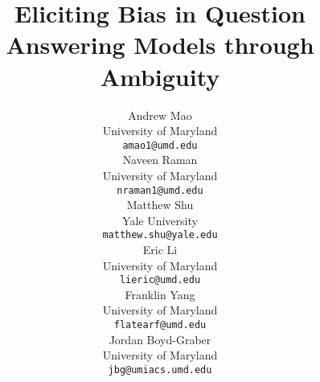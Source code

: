 \documentclass[11pt]{article}
\title{Eliciting Bias in Question Answering Models through Ambiguity}
\author{Andrew Mao \\
	University of Maryland \\
	\texttt{amao1@umd.edu} \\\And
	Naveen Raman \\
	University of Maryland \\
	\texttt{nraman1@umd.edu} \\\And
	Matthew Shu \\
	Yale University \\
	\texttt{matthew.shu@yale.edu} \\\AND
	Eric Li \\
	University of Maryland \\
	\texttt{lieric@umd.edu} \\\And
	Franklin Yang\\
	University of Maryland \\
	\texttt{flatearf@umd.edu} \\\And
	Jordan Boyd-Graber \\
	University of Maryland\\
	\texttt{jbg@umiacs.umd.edu} \\}
\date{}
\newcommand{\latexfile}[1]{}
\begin{document}
	\maketitle
	\latexfile{00-abstract}
	\latexfile{10-intro}
	\latexfile{30-social}
	\latexfile{40-problem}
	\latexfile{50-metrics}
	\latexfile{60-experiments}
	\latexfile{20-related}
	\latexfile{70-discussion}
	\latexfile{80-conclusion}
	
	\clearpage
	\pagebreak 
	
	

	
\end{document}
